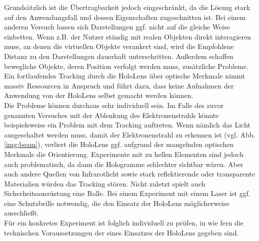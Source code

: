 Grundsätzlich ist die Übertragbarkeit jedoch eingeschränkt, da die Lösung stark auf den Anwendungsfall und dessen Eigenschaften zugeschnitten ist. Bei einem anderen Versuch lassen sich Darstellungen ggf. nicht auf die gleiche Weise einbetten. Wenn z.B. der Nutzer ständig mit realen Objekten direkt interagieren muss, an denen die virtuellen Objekte verankert sind, wird die Empfohlene Distanz zu den Darstellungen dauerhaft unterschritten. Außerdem schaffen bewegliche Objekte, deren Position verfolgt werden muss, zusätzliche Probleme. Ein fortlaufendes Tracking durch die HoloLens über optische Merkmale nimmt massiv Ressourcen in Anspruch und führt dazu, dass keine Aufnahmen der Anwendung von der HoloLens selbst gemacht werden können.\\

Die Probleme können durchaus sehr individuell sein. Im Falle des zuvor genannten Versuches mit der Ablenkung des Elektronenstrahls könnte beispielsweise ein Problem mit dem Tracking auftreten. Wenn nämlich das Licht ausgeschaltet werden muss, damit der Elektronenstrahl zu erkennen ist (vgl. Abb. \ref{img:beam}), verliert die HoloLens ggf. aufgrund der mangelnden optischen Merkmale die Orientierung. Experimente mit zu hellen Elementen sind jedoch auch problematisch, da dann die Hologramme schlechter sichtbar wären. Aber auch andere Quellen von Infrarotlicht sowie stark reflektierende oder transparente Materialien würden das Tracking stören. Nicht zuletzt spielt auch Sicherheitsausrüstung eine Rolle. Bei einem Experiment mit einem Laser ist ggf. eine Schutzbrille notwendig, die den Einsatz der HoloLens möglicherweise ausschließt.\\

Für ein konkretes Experiment ist folglich individuell zu prüfen, in wie fern die technischen Voraussetzungen der eines Einsatzes der HoloLens gegeben sind.
	
	
	
	
	
	
	
	
	
	
	